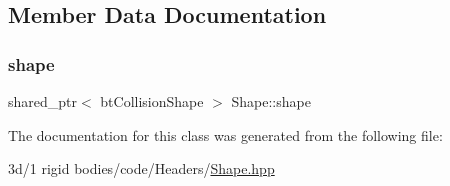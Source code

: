 \subsection{Member Data Documentation}
\mbox{\label{class_shape_a2dfbbc42dde579257637148489c1fb9b}} 
\subsubsection{\texorpdfstring{shape}{shape}}
{\footnotesize\ttfamily shared\+\_\+ptr$<$ bt\+Collision\+Shape $>$ Shape\+::shape\hspace{0.3cm}{\ttfamily [protected]}}



The documentation for this class was generated from the following file\+:\begin{DoxyCompactItemize}
\item 
3d/1 rigid bodies/code/\+Headers/\mbox{\hyperlink{_shape_8hpp}{Shape.\+hpp}}\end{DoxyCompactItemize}

